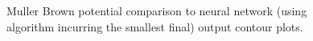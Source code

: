 \documentclass{article}
\theoremstyle{mystyle}
\begin{document}
\begin{figure}[H]
\begin{minipage}{.5\linewidth}
\end{minipage}\par\medskip
\centering
{}
\caption{Muller Brown potential comparison to neural network (using algorithm incurring the smallest final) output contour plots.}
\label{fig: Muller Brown contour plots}
\end{figure}

\newpage




\end{document}
